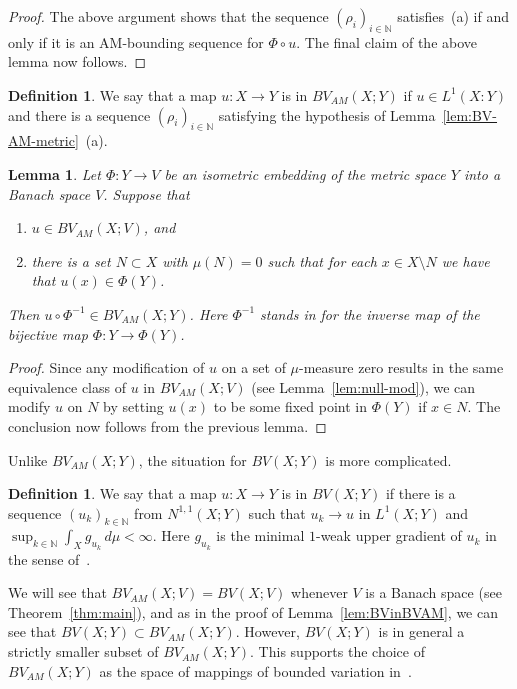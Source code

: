 \documentclass[11pt, letterpaper]{amsart} %
\newcommand*{\N}{{\mathbb N}}
\numberwithin{equation}{section}
\theoremstyle{plain}
\newtheorem{lemma}[equation]{Lemma}
\theoremstyle{definition}
\newtheorem{definition}[equation]{Definition}
\begin{document}
{\begin{proof}
The above argument shows that the sequence $(\rho_i)_{i\in\N}$ satisfies~(a) if and only if it is an AM-bounding sequence
for $\Phi\circ u$. The final claim of the above lemma now follows.
\end{proof}


\begin{definition}
We say that a map $u:X\to Y$ is in $BV_{AM}(X;Y)$ if $u\in L^1(X:Y)$ and there is a sequence $(\rho_i)_{i\in\N}$ satisfying
the hypothesis of Lemma~\ref{lem:BV-AM-metric}~(a).
\end{definition}


\begin{lemma} \label{lem-isom}
Let $\Phi:Y\to V$ be an isometric embedding of the metric space $Y$ into a Banach space $V$. Suppose that
\begin{enumerate}
\item[(a)] $u\in BV_{AM}(X;V)$, and
\item[(b)] there is a set $N\subset X$ with $\mu(N)=0$ such that for each $x\in X\setminus N$ we have that
$u(x)\in \Phi(Y)$.
\end{enumerate}
Then $u\circ\Phi^{-1}\in BV_{AM}(X;Y)$. Here $\Phi^{-1}$ stands in for the inverse map of the bijective map
$\Phi:Y\to\Phi(Y)$.
\end{lemma}

\begin{proof}
Since any modification of $u$ on a set of $\mu$-measure zero results in the same equivalence class of $u$ in
$BV_{AM}(X;V)$ (see Lemma~\ref{lem:null-mod}), we can modify $u$ on $N$ by setting $u(x)$ to be some fixed
point in $\Phi(Y)$ if $x\in N$. The conclusion now follows from the previous lemma.
\end{proof}

Unlike $BV_{AM}(X;Y)$, the situation for $BV(X; Y)$ is more complicated. 

\begin{definition}
We say that a map $u:X\to Y$ is in $BV(X;Y)$ if there is a sequence $(u_k)_{k\in\N}$ from 
$N^{1,1}(X;Y)$ such that $u_k\to u$ in $L^1(X;Y)$ and $\sup_{k\in\N}\int_Xg_{u_k}\, d\mu<\infty$.
Here $g_{u_k}$ is the minimal $1$-weak upper gradient of $u_k$ in the sense of~\cite[page~161]{HKSTbook}.
\end{definition}

We will see that $BV_{AM}(X;V)=BV(X;V)$ whenever $V$ is a Banach space (see
Theorem~\ref{thm:main}), and as in the proof of Lemma~\ref{lem:BVinBVAM}, we can see that
$BV(X;Y)\subset BV_{AM}(X;Y)$.
However, $BV(X;Y)$ is in general a
strictly smaller subset of $BV_{AM}(X;Y)$.
This supports the choice of $BV_{AM}(X;Y)$ as the space of mappings of bounded variation in~\cite{Lah1, Lah2}.

}
\end{document}
